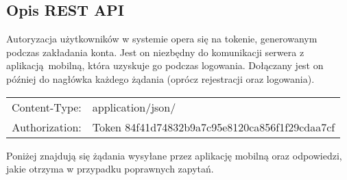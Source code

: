 \newpage

\subsection{Opis REST API}

Autoryzacja użytkowników w systemie opera się na tokenie, generowanym podczas zakładania konta. Jest on niezbędny do komunikacji serwera z aplikacją mobilną, która uzyskuje go podczas logowania. Dołączany jest on później do nagłówka każdego żądania (oprócz rejestracji oraz logowania).

\label{naglowek_zadania}
\vspace{-0.3cm}
\begin{table}[h]
	\begin{center}
		\begin{tabular}{ rl }
			Content-Type:&application/json/\\
			Authorization:&Token 84f41d74832b9a7c95e8120ca856f1f29cdaa7cf\\
		\end{tabular}
	\end{center}
\end{table}

Poniżej znajdują się żądania wysyłane przez aplikację mobilną oraz odpowiedzi, jakie otrzyma w przypadku poprawnych zapytań.

\vspace{0.5cm}

